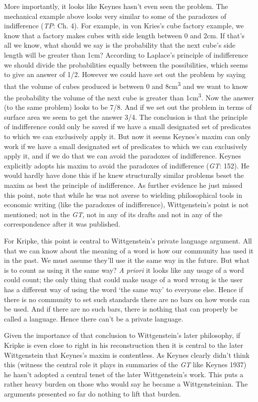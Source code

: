 More importantly, it looks like Keynes hasn't even seen the problem. The mechanical example above looks very similar to some of the paradoxes of indifference (\textit{TP}: Ch. 4). For example, in von Kries's cube factory example, we know that a factory makes cubes with side length between 0 and 2cm. If that's all we know, what should we say is the probability that the next cube's side length will be greater than 1cm? According to Laplace's principle of indifference we should divide the probabilities equally between the possibilities, which seems to give an answer of 1/2. However we could have set out the problem by saying that the volume of cubes produced is between 0 and 8cm\textsuperscript{3} and we want to know the probability the volume of the next cube is greater than 1cm\textsuperscript{3}. Now the answer (to the same problem) looks to be 7/8. And if we set out the problem in terms of surface area we seem to get the answer 3/4. The conclusion is that the principle of indifference could only be saved if we have a small designated set of predicates to which we can exclusively apply it. But now it seems Keynes's maxim can only work if we have a small designated set of predicates to which we can exclusively apply it, and if we do that we can avoid the paradoxes of indifference. Keynes explicitly adopts his maxim to avoid the paradoxes of indifference (\textit{GT}: 152). He would hardly have done this if he knew structurally similar problems beset the maxim as best the principle of indifference. As further evidence he just missed this point, note that while he was not averse to wielding philosophical tools in economic writing (like the paradoxes of indifference), Wittgenstein's point is not mentioned; not in the \textit{GT}, not in any of its drafts and not in any of the correspondence after it was published.

For Kripke, this point is central to Wittgenstein's private language argument. All that we can know about the meaning of a word is how our community has used it in the past. We must assume they'll use it the same way in the future. But what is to count as using it the same way? \textit{A} \textit{priori} it looks like any usage of a word could count; the only thing that could make usage of a word wrong is the user has a different way of using the word `the same way' to everyone else. Hence if there is no community to set such standards there are no bars on how words can be used. And if there are no such bars, there is nothing that can properly be called a language. Hence there can't be a private language. 

Given the importance of that conclusion to Wittgenstein's later philosophy, if Kripke is even close to right in his reconstruction then it is central to the later Wittgenstein that Keynes's maxim is contentless. As Keynes clearly didn't think this (witness the central role it plays in summaries of the \textit{GT} like Keynes 1937) he hasn't adopted a central tenet of the later Wittgenstein's work. This puts a rather heavy burden on those who would say he became a Wittgensteinian. The arguments presented so far do nothing to lift that burden.
